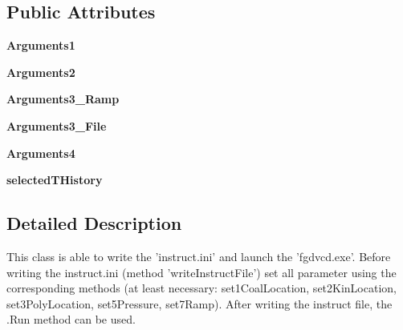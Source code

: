 \subsection*{\-Public \-Attributes}
\begin{DoxyCompactItemize}
\item 
\hypertarget{classFGDVC__SetAndLaunch_1_1SetterAndLauncher_af7f22310acd15417a0e5f1bc297626b4}{{\bfseries \-Arguments1}}\label{classFGDVC__SetAndLaunch_1_1SetterAndLauncher_af7f22310acd15417a0e5f1bc297626b4}

\item 
\hypertarget{classFGDVC__SetAndLaunch_1_1SetterAndLauncher_a4accc4b2a50a765f5517ef73bf5061e7}{{\bfseries \-Arguments2}}\label{classFGDVC__SetAndLaunch_1_1SetterAndLauncher_a4accc4b2a50a765f5517ef73bf5061e7}

\item 
\hypertarget{classFGDVC__SetAndLaunch_1_1SetterAndLauncher_af941399e1fd5c4f091379215a21d854e}{{\bfseries \-Arguments3\-\_\-\-Ramp}}\label{classFGDVC__SetAndLaunch_1_1SetterAndLauncher_af941399e1fd5c4f091379215a21d854e}

\item 
\hypertarget{classFGDVC__SetAndLaunch_1_1SetterAndLauncher_aada7a41930084a8210fbaf5c713237b2}{{\bfseries \-Arguments3\-\_\-\-File}}\label{classFGDVC__SetAndLaunch_1_1SetterAndLauncher_aada7a41930084a8210fbaf5c713237b2}

\item 
\hypertarget{classFGDVC__SetAndLaunch_1_1SetterAndLauncher_ab0da1477203319c99229e06da1b06d00}{{\bfseries \-Arguments4}}\label{classFGDVC__SetAndLaunch_1_1SetterAndLauncher_ab0da1477203319c99229e06da1b06d00}

\item 
\hypertarget{classFGDVC__SetAndLaunch_1_1SetterAndLauncher_abd860c779b518516cb603694562ca856}{{\bfseries selected\-T\-History}}\label{classFGDVC__SetAndLaunch_1_1SetterAndLauncher_abd860c779b518516cb603694562ca856}

\end{DoxyCompactItemize}


\subsection{\-Detailed \-Description}
\begin{DoxyVerb}This class is able to write the 'instruct.ini' and launch the 'fgdvcd.exe'. Before writing the instruct.ini (method 'writeInstructFile') set all parameter using the corresponding methods (at least necessary: set1CoalLocation, set2KinLocation, set3PolyLocation, set5Pressure, set7Ramp). After writing the instruct file, the .Run method can be used.\end{DoxyVerb}
 

